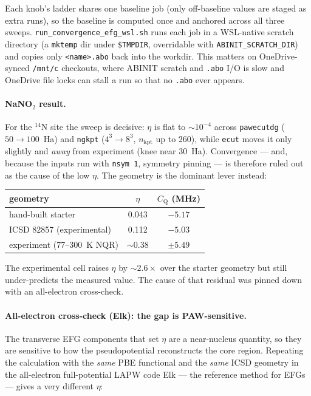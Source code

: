 \documentclass[11pt,oneside]{report}
\newcommand{\code}[1]{{\small\nolinkurl{#1}}}
\newcommand{\cmd}[1]{\texttt{\small #1}}
\newcommand{\Cq}{C_{\mathrm{Q}}}
\begin{document}
Each knob's ladder shares one baseline job (only off-baseline values are staged as
extra runs), so the baseline is computed once and anchored across all three
sweeps. \code{run\_convergence\_efg\_wsl.sh} runs each job in a WSL-native scratch
directory (a \code{mktemp} dir under \code{\$TMPDIR}, overridable with
\code{ABINIT\_SCRATCH\_DIR}) and copies only \code{<name>.abo} back into the
workdir. This matters on OneDrive-synced \code{/mnt/c} checkouts, where ABINIT
scratch and \code{.abo} I/O is slow and OneDrive file locks can stall a run so
that no \code{.abo} ever appears.

\paragraph{NaNO$_2$ result.} For the $^{14}$N site the sweep is decisive: $\eta$
is flat to $\sim 10^{-4}$ across \code{pawecutdg} ($50\!\to\!100$~Ha) and
\code{ngkpt} ($4^3\!\to\!8^3$, $n_{\mathrm{kpt}}$ up to $260$), while \code{ecut}
moves it only slightly and \emph{away} from experiment (knee near $30$~Ha).
Convergence --- and, because the inputs run with \cmd{nsym 1}, symmetry pinning
--- is therefore ruled out as the cause of the low $\eta$. The geometry is the
dominant lever instead:

\begin{center}
\begin{tabular}{lcc}
\toprule
geometry & $\eta$ & $\Cq$ (MHz) \\
\midrule
hand-built starter & 0.043 & $-5.17$ \\
ICSD 82857 (experimental) & 0.112 & $-5.03$ \\
experiment (77--300~K NQR) & $\sim 0.38$ & $\pm 5.49$ \\
\bottomrule
\end{tabular}
\end{center}

The experimental cell raises $\eta$ by $\sim 2.6\times$ over the starter geometry
but still under-predicts the measured value. The cause of that residual was
pinned down with an all-electron cross-check.

\paragraph{All-electron cross-check (Elk): the gap is PAW-sensitive.} The
transverse EFG components that set $\eta$ are a near-nucleus quantity, so they are
sensitive to how the pseudopotential reconstructs the core region. Repeating the
calculation with the \emph{same} PBE functional and the \emph{same} ICSD geometry
in the all-electron full-potential LAPW code Elk --- the reference method for EFGs
--- gives a very different $\eta$:
\end{document}
